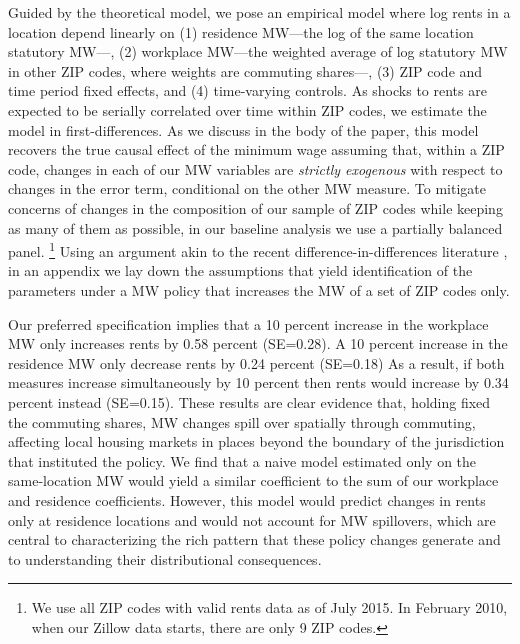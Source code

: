 Guided by the theoretical model, we pose an empirical model where log rents in 
a location depend linearly on
(1) residence MW---the log of the same location statutory MW---,
(2) workplace MW---the weighted average of log statutory MW in other ZIP codes,
where weights are commuting shares---,
(3)  ZIP code and time period fixed effects,
and 
(4) time-varying controls.
As shocks to rents are expected to be serially correlated over time within ZIP 
codes, we estimate the model in first-differences.
As we discuss in the body of the paper, this model recovers the true causal effect
of the minimum wage assuming that, within a ZIP code, changes in each of our MW 
variables are \textit{strictly exogenous} with respect to changes in the error 
term, conditional on the other MW measure.
To mitigate concerns of changes in the composition of our sample of ZIP codes 
while keeping as many of them as possible, in our baseline analysis we use a 
partially balanced panel.%
\footnote{We use all ZIP codes with valid rents data as of July 2015. 
In February 2010, when our Zillow data starts, there are only 9 ZIP codes.}
Using an argument akin to the recent difference-in-differences literature
\parencite[e.g.,][]{CallawaySantAnna2021,CallawayEtAl2021}, 
in an appendix we lay down the assumptions that yield identification of the 
parameters under a MW policy that increases the MW of a set of ZIP codes only.


Our preferred specification implies that a 10 percent increase in the workplace
MW only increases rents by 0.58 percent (SE=0.28).
A 10 percent increase in the residence MW only decrease rents by 0.24 percent
(SE=0.18)
As a result, if both measures increase simultaneously by 10 percent then 
rents would increase by 0.34 percent instead (SE=0.15).
These results are clear evidence that, holding fixed the commuting shares, MW 
changes spill over spatially through commuting, affecting local housing markets 
in places beyond the boundary of the jurisdiction that instituted the policy.
We find that a naive model estimated only on the same-location MW would yield a 
similar coefficient to the sum of our workplace and residence coefficients.
However, this model would predict changes in rents only at residence locations and 
would not account for MW spillovers, which are central to characterizing the rich
pattern that these policy changes generate and to understanding their 
distributional consequences.

